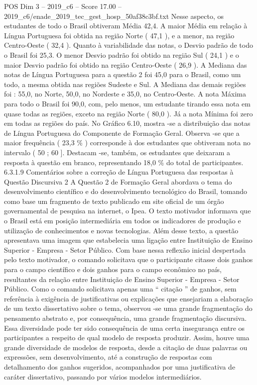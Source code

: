 \begin{textsample}{POS Dim 3 – 2019\_c6 – Score 17.00 – 2019\_c6/enade\_2019\_tec\_gest\_hosp\_50af38c3bf.txt}
Nesse aspecto, os estudantes de todo o Brasil obtiveram Média 42,4.
A maior Média em relação à Língua Portuguesa foi obtida na região Norte ( 47,1 ), e a menor, na região Centro-Oeste ( 32,4 ).
Quanto à variabilidade das notas, o Desvio padrão de todo o Brasil foi 25,3.
O menor Desvio padrão foi obtido na região Sul ( 24,1 ) e o maior Desvio padrão foi obtido na região Centro-Oeste ( 26,9 ).
A Mediana das notas de Língua Portuguesa para a questão 2 foi 45,0 para o Brasil, como um todo, a mesma obtida nas regiões Sudeste e Sul.
A Mediana das demais regiões foi : 55,0, no Norte, 50,0, no Nordeste e 35,0, no Centro-Oeste.
A nota Máxima para todo o Brasil foi 90,0, com, pelo menos, um estudante tirando essa nota em quase todas as regiões, exceto na região Norte ( 80,0 ).
Já a nota Mínima foi zero em todas as regiões do país.
No Gráfico 6.10, mostra -se a distribuição das notas de Língua Portuguesa do Componente de Formação Geral.
Observa -se que a maior frequência ( 23,3 \% ) corresponde à dos estudantes que obtiveram nota no intervalo ( 50 ; 60 ].
Destacam -se, também, os estudantes que deixaram a resposta à questão em branco, representando 18,0 \% do total de participantes. 6.3.1.9 Comentários sobre a correção de Língua Portuguesa das respostas à Questão Discursiva 2 A Questão 2 de Formação Geral abordava o tema do desenvolvimento científico e do desenvolvimento tecnológico do Brasil, tomando como base um fragmento de texto publicado em site oficial de um órgão governamental de pesquisa na internet, o Ipea.
O texto motivador informava que o Brasil está em posição intermediária em todos os indicadores de produção e utilização de conhecimentos e novas tecnologias.
Além desse texto, a questão apresentava uma imagem que estabelecia uma ligação entre Instituição de Ensino Superior - Empresa - Setor Público.
Com base nessa reflexão inicial despertada pelo texto motivador, o comando solicitava que o participante citasse dois ganhos para o campo científico e dois ganhos para o campo econômico no país, resultantes da relação entre Instituição de Ensino Superior - Empresa - Setor Público.
Como o comando solicitava apenas uma “ citação ” de ganhos, sem referência à exigência de justificativas ou explicações que ensejariam a elaboração de um texto dissertativo sobre o tema, observou -se uma grande fragmentação do pensamento abstrato e, por consequência, uma grande fragmentação discursiva.
Essa diversidade pode ter sido consequência de uma certa insegurança entre os participantes a respeito de qual modelo de resposta produzir.
Assim, houve uma grande diversidade de modelos de resposta, desde a citação de duas palavras ou expressões, sem desenvolvimento, até a construção de respostas com detalhamento dos ganhos sugeridos, acompanhados por uma justificativa de caráter dissertativo, passando por vários modelos intermediários.

\end{textsample}
